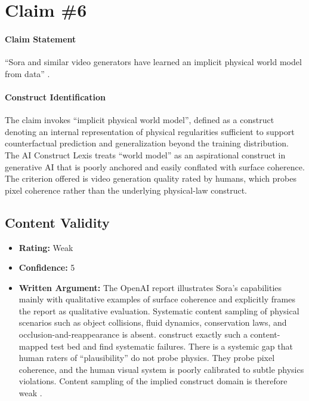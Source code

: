 \section{Claim \#6}

\paragraph{Claim Statement} ``Sora and similar video generators have learned an implicit physical world model from data'' \citep{openai2024sora}.

\paragraph{Construct Identification} The claim invokes ``implicit physical world model'', defined as a construct denoting an internal representation of physical regularities sufficient to support counterfactual prediction and generalization beyond the training distribution. The AI Construct Lexis \citep{aiconstructlexis} treats ``world model'' as an aspirational construct in generative AI that is poorly anchored and easily conflated with surface coherence. The criterion offered is video generation quality rated by humans, which probes pixel coherence rather than the underlying physical-law construct.

\subsection{Content Validity}
\begin{itemize}
    \item \textbf{Rating:} Weak
    \item \textbf{Confidence:} 5
    \item \textbf{Written Argument:} The OpenAI report illustrates Sora's capabilities mainly with qualitative examples of surface coherence and explicitly frames the report as qualitative evaluation. Systematic content sampling of physical scenarios such as object collisions, fluid dynamics, conservation laws, and occlusion-and-reappearance is absent. \citet{kang2024video} construct exactly such a content-mapped test bed and find systematic failures. There is a systemic gap that human raters of ``plausibility'' do not probe physics. They probe pixel coherence, and the human visual system is poorly calibrated to subtle physics violations. Content sampling of the implied construct domain is therefore weak \citep{salaudeen2025measurement}.
\end{itemize}

